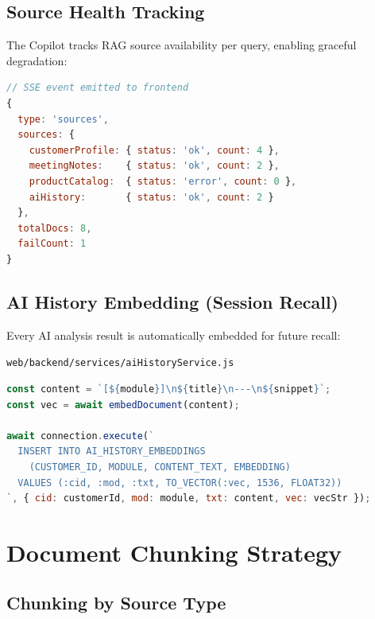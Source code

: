 \documentclass[12pt,a4paper]{article}
\begin{document}
\subsection{Source Health Tracking}

The Copilot tracks RAG source availability per query, enabling graceful degradation:

\begin{lstlisting}[language=JavaScript, caption={Source health metadata emitted to client}]
// SSE event emitted to frontend
{
  type: 'sources',
  sources: {
    customerProfile: { status: 'ok', count: 4 },
    meetingNotes:    { status: 'ok', count: 2 },
    productCatalog:  { status: 'error', count: 0 },
    aiHistory:       { status: 'ok', count: 2 }
  },
  totalDocs: 8,
  failCount: 1
}
\end{lstlisting}

\subsection{AI History Embedding (Session Recall)}

Every AI analysis result is automatically embedded for future recall:

\texttt{web/backend/services/aiHistoryService.js}

\begin{lstlisting}[language=JavaScript, caption={Automatic AI history embedding}]
const content = `[${module}]\n${title}\n---\n${snippet}`;
const vec = await embedDocument(content);

await connection.execute(`
  INSERT INTO AI_HISTORY_EMBEDDINGS
    (CUSTOMER_ID, MODULE, CONTENT_TEXT, EMBEDDING)
  VALUES (:cid, :mod, :txt, TO_VECTOR(:vec, 1536, FLOAT32))
`, { cid: customerId, mod: module, txt: content, vec: vecStr });
\end{lstlisting}

\section{Document Chunking Strategy}
\label{sec:chunking}

\subsection{Chunking by Source Type}
\end{document}
